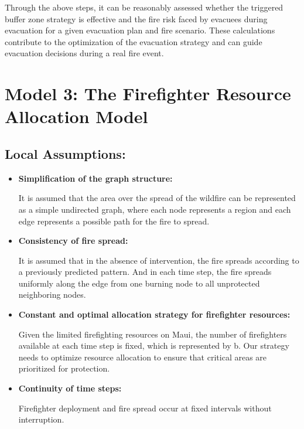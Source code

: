 \documentclass[12pt]{article}  %
\begin{document}
 Through the above steps, it can be reasonably assessed whether the triggered buffer zone strategy is effective and the fire risk faced by evacuees during evacuation for a given evacuation plan and fire scenario. These calculations contribute to the optimization of the evacuation strategy and can guide evacuation decisions during a real fire event.
 
 \section{Model 3: The Firefighter Resource Allocation Model}
 \subsection{Local Assumptions:}
 \begin{itemize}
 	\setlength{\parsep}{0ex} 
 	\setlength{\topsep}{2ex} 
 	\setlength{\itemsep}{1ex} 
 	\item \textbf{Simplification of the graph structure:} 
 	
 	It is assumed that the area over the spread of the wildfire can be represented as a simple undirected graph, where each node represents a region and each edge represents a possible path for the fire to spread.
 	
 	\item \textbf{Consistency of fire spread:} 
 	
 	It is assumed that in the absence of intervention, the fire spreads according to a previously predicted pattern. And in each time step, the fire spreads uniformly along the edge from one burning node to all unprotected neighboring nodes.

	\item \textbf{Constant and optimal allocation strategy for firefighter resources:} 
	
	 Given the limited firefighting resources on Maui, the number of firefighters available at each time step is fixed, which is represented by b. Our strategy needs to optimize resource allocation to ensure that critical areas are prioritized for protection.
 
 	\item \textbf{Continuity of time steps:} 
 	
     Firefighter deployment and fire spread occur at fixed intervals without interruption.
\end{itemize}
\end{document}
